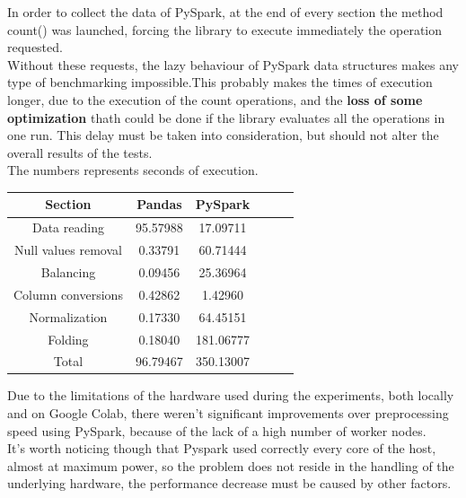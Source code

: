 \documentclass[
	letterpaper, %
	10pt, %
]{class}
\begin{document}
In order to collect the data of PySpark, at the end of every section the method count() was launched, forcing the library to execute immediately the operation requested.\\

Without these requests, the lazy behaviour of PySpark data structures makes any type of benchmarking impossible.This probably makes the times of execution longer, due to
the execution of the count operations, and the \textbf{loss of some optimization} thath could be done if the library evaluates all the operations in one run.
This delay must be taken into consideration, but should not alter the overall results of the tests.\\

The numbers represents seconds of execution.

\begin{center}
    \begin{tabular}{ |c|c|c|c|c|c| }
        \hline
        Section             & Pandas   & PySpark   \\
        \hline
        Data reading        & 95.57988 & 17.09711  \\
        Null values removal & 0.33791  & 60.71444  \\
        Balancing           & 0.09456  & 25.36964  \\
        Column conversions  & 0.42862  & 1.42960   \\
        Normalization       & 0.17330  & 64.45151  \\
        Folding             & 0.18040  & 181.06777 \\
        Total               & 96.79467 & 350.13007 \\
        \hline
    \end{tabular}
\end{center}


Due to the limitations of the hardware used during the experiments, both locally and on Google Colab, there weren't significant improvements over preprocessing speed using PySpark, because of the lack of a high number of worker nodes.\\
It's worth noticing though that Pyspark used correctly every core of the host, almost at maximum power, so the problem does not reside in the handling of the underlying hardware, the performance decrease must be caused by other factors.
\end{document}
